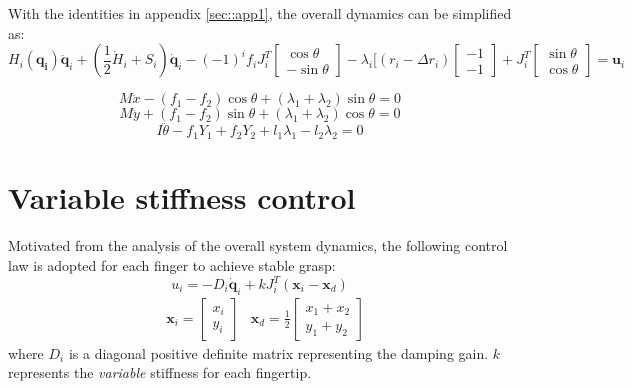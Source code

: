 \documentclass[]{article}
\begin{document}
With the identities in appendix \ref{sec::app1}, the overall dynamics can be simplified as:
\begin{equation}
H_i(\mathbf{q_i})\ddot{\mathbf{q}}_i+(\frac{1}{2}\dot{H}_i+S_i)\mathbf{\dot{q}}_i-(-1)^if_iJ_i^T\begin{bmatrix}
\cos\theta\\
-\sin\theta
\end{bmatrix}-\lambda_i[(r_i-\Delta r_i)\begin{bmatrix}
-1\\-1
\end{bmatrix} + J_i^T\begin{bmatrix}
\sin\theta\\\cos\theta
\end{bmatrix}=\mathbf{u}_i
\end{equation}

\begin{equation}
M\ddot{x}-(f_1-f_2)\cos\theta+(\lambda_1+\lambda_2)\sin\theta=0
\end{equation}
\begin{equation}
M\ddot{y}+(f_1-f_2)\sin\theta+(\lambda_1+\lambda_2)\cos\theta = 0
\end{equation}
\begin{equation}
I\ddot{\theta}-f_1Y_1+f_2Y_2+l_1\lambda_1-l_2\lambda_2=0
\end{equation}
\section{Variable stiffness control}
Motivated from the analysis of the overall system dynamics, the following control law is adopted for each finger to achieve stable grasp:
\begin{equation}
u_i=-D_i\mathbf{\dot{q}}_i+kJ_i^T(\mathbf{x}_i-\mathbf{x}_d)
\end{equation}
\begin{align}
&\mathbf{x}_i=\begin{bmatrix}
x_i\\
y_i
\end{bmatrix}
&\mathbf{x}_d=\frac{1}{2}\begin{bmatrix}
x_1+x_2\\
y_1+y_2
\end{bmatrix}
\end{align}
where $D_i$ is a diagonal positive definite matrix representing the damping gain. $k$ represents the \emph{variable} stiffness for each fingertip.
\end{document}
